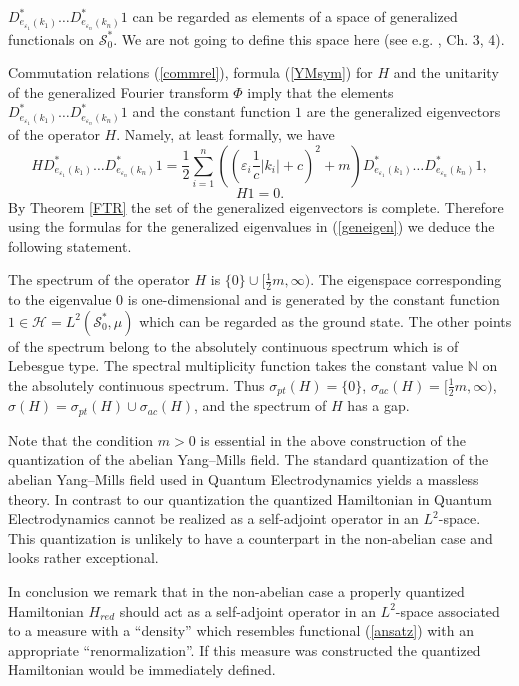 \documentclass{amsart}
\begin{document}
$D_{e_{\varepsilon_1}(k_1)}^*\ldots D^*_{e_{\varepsilon_n}(k_n)}1$ can be regarded as elements of a space of generalized functionals on $\mathcal{S}_0^*$. We are not going to define this space here (see e.g. \cite{Hid}, Ch. 3, 4). 

Commutation relations (\ref{commrel}), formula (\ref{YMsym}) for $H$ and the unitarity of the generalized Fourier transform $\Phi$ imply that the elements $D_{e_{\varepsilon_1}(k_1)}^*\ldots D^*_{e_{\varepsilon_n}(k_n)}1$ and the constant function $1$ are the generalized eigenvectors of the operator $H$. Namely, at least formally, we have
\begin{equation}\label{geneigen}
HD_{e_{\varepsilon_1}(k_1)}^*\ldots D^*_{e_{\varepsilon_n}(k_n)}1=\frac12\sum_{i=1}^n((\varepsilon_i\frac1c|k_i|+c)^2+m)D_{e_{\varepsilon_1}(k_1)}^*\ldots D^*_{e_{\varepsilon_n}(k_n)}1,	
\end{equation}
$$
H1=0.
$$
By Theorem \ref{FTR} the set of the generalized eigenvectors is complete. Therefore using the formulas for the generalized eigenvalues in (\ref{geneigen}) we deduce the following statement.
\begin{theorem}
The spectrum of the operator $H$ is $\{0\}\cup[\frac12m,\infty)$. The eigenspace corresponding to the eigenvalue $0$ is one-dimensional and is generated by the constant function $1\in \mathcal{H}=L^2(\mathcal{S}_0^*,\mu)$ which can be regarded as the ground state. The other points of the spectrum belong to the absolutely continuous spectrum which is of Lebesgue type. The spectral  multiplicity function takes the constant value $\mathbb{N}$ on the absolutely continuous spectrum. Thus $\sigma_{pt}(H)=\{0\}$, $\sigma_{ac}(H)=[\frac12m,\infty)$, $\sigma(H)=\sigma_{pt}(H)\cup\sigma_{ac}(H)$, and the spectrum of $H$ has a gap. 
\end{theorem}

\begin{remark}
Note that the condition $m>0$ is essential in the above construction of the quantization of the abelian Yang--Mills field. The standard quantization of the abelian Yang--Mills field used in Quantum Electrodynamics yields a massless theory. In contrast to our quantization the quantized Hamiltonian in Quantum Electrodynamics cannot be realized as a self-adjoint operator in an $L^2$-space. This quantization is unlikely to have a counterpart in the non-abelian case and looks rather exceptional. 
\end{remark}
 
In conclusion we remark that in the non-abelian case a properly quantized Hamiltonian $H_{red}$ should act as a self-adjoint operator in an $L^2$-space associated to a measure with a ``density'' which resembles functional (\ref{ansatz}) with an appropriate ``renormalization''. If this measure was constructed the quantized Hamiltonian would be immediately defined.  
\end{document}
